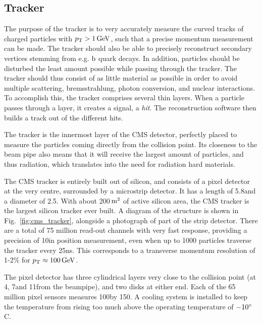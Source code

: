 \subsection{Tracker \label{sec:cms_tracker}}

The purpose of the tracker is to very accurately measure the curved tracks of charged
particles with $\pt > 1\GeV$, such that a precise momentum measurement can be made. 
The tracker should also be able to precisely reconstruct secondary
vertices stemming from e.g. $\cPqb$ quark decays. 
In addition, particles should be disturbed the least amount possible while passing through the
tracker. The tracker should thus consist of as little material as possible in order to avoid
multiple scattering, bremsstrahlung, photon conversion, and nuclear interactions.
To accomplish this, the tracker comprises several thin layers. When a particle passes
through a layer, it creates a signal, a \textit{hit}. The reconstruction software then builds a
track out of the different hits. 

The tracker is the innermost layer of the CMS detector, perfectly placed to measure the particles
coming directly from the collision point. Its closeness to the beam pipe also means that it will
receive the largest amount of particles, and thus radiation, which translates into the need for
radiation hard materials. 

The CMS tracker is entirely built out of silicon, and consists of a pixel detector at the very
centre, surrounded by a microstrip detector. It has a length of 5.8\meter and a diameter of
2.5\meter. With about 200$\meter^\text{2}$ of active silicon area, the CMS tracker is the largest
silicon tracker ever built. A diagram of the structure is shown in
Fig.~\ref{fig:cms_tracker}, alongside a photograph of part of the strip detector. 
There are a total of 75 million read-out channels with very fast response, providing a precision of
10\mum in position measurement, even when up to 1000 particles traverse the tracker every
25\unit{ns}. This corresponds to a transverse momentum resolution of 1-2\% for $\pt \approx
100\GeV$. 

The pixel detector has three cylindrical layers very close to the collision point (at 4\cm, 7\cm and
11\cm from the beampipe), and two disks at either end. Each of the 65 million pixel sensors measures
100\mum by 150\mum. A cooling system is installed to keep the temperature from rising too much
above the operating temperature of $-10\de$C.

